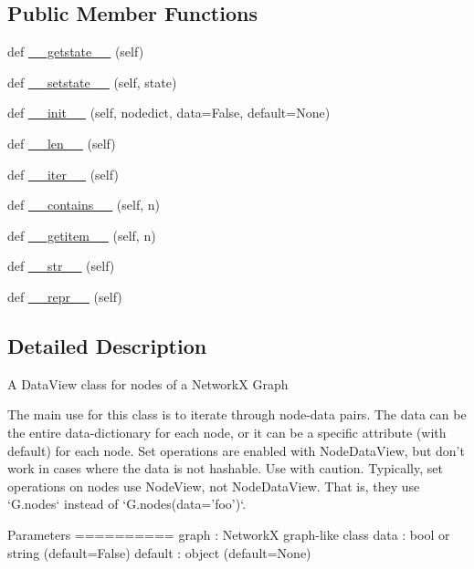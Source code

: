 \subsection*{Public Member Functions}
\begin{DoxyCompactItemize}
\item 
def \hyperlink{classnetworkx_1_1classes_1_1reportviews_1_1NodeDataView_a123061bcbddb4f02ef81682a4a207cd7}{\+\_\+\+\_\+getstate\+\_\+\+\_\+} (self)
\item 
def \hyperlink{classnetworkx_1_1classes_1_1reportviews_1_1NodeDataView_a865a109ce4f700ca9b2cd1b409ed5b0f}{\+\_\+\+\_\+setstate\+\_\+\+\_\+} (self, state)
\item 
def \hyperlink{classnetworkx_1_1classes_1_1reportviews_1_1NodeDataView_a1f23092eaffd68cbd49213cb61684ff8}{\+\_\+\+\_\+init\+\_\+\+\_\+} (self, nodedict, data=False, default=None)
\item 
def \hyperlink{classnetworkx_1_1classes_1_1reportviews_1_1NodeDataView_a505f15ed7f97248d6645a7ecce613033}{\+\_\+\+\_\+len\+\_\+\+\_\+} (self)
\item 
def \hyperlink{classnetworkx_1_1classes_1_1reportviews_1_1NodeDataView_a209559ecf3306d902f395fa0167b710f}{\+\_\+\+\_\+iter\+\_\+\+\_\+} (self)
\item 
def \hyperlink{classnetworkx_1_1classes_1_1reportviews_1_1NodeDataView_ab7d9f2b1cd394ddbf4343f95bcbef1d4}{\+\_\+\+\_\+contains\+\_\+\+\_\+} (self, n)
\item 
def \hyperlink{classnetworkx_1_1classes_1_1reportviews_1_1NodeDataView_ac56965db7c345623782c302cbe188cd1}{\+\_\+\+\_\+getitem\+\_\+\+\_\+} (self, n)
\item 
def \hyperlink{classnetworkx_1_1classes_1_1reportviews_1_1NodeDataView_a11767c71df5d2c74a3d31a8ee2e69e77}{\+\_\+\+\_\+str\+\_\+\+\_\+} (self)
\item 
def \hyperlink{classnetworkx_1_1classes_1_1reportviews_1_1NodeDataView_a6aae95436a476c118d7f2bfa3dd06437}{\+\_\+\+\_\+repr\+\_\+\+\_\+} (self)
\end{DoxyCompactItemize}


\subsection{Detailed Description}
\begin{DoxyVerb}A DataView class for nodes of a NetworkX Graph

The main use for this class is to iterate through node-data pairs.
The data can be the entire data-dictionary for each node, or it
can be a specific attribute (with default) for each node.
Set operations are enabled with NodeDataView, but don't work in
cases where the data is not hashable. Use with caution.
Typically, set operations on nodes use NodeView, not NodeDataView.
That is, they use `G.nodes` instead of `G.nodes(data='foo')`.

Parameters
==========
graph : NetworkX graph-like class
data : bool or string (default=False)
default : object (default=None)
\end{DoxyVerb}
 

